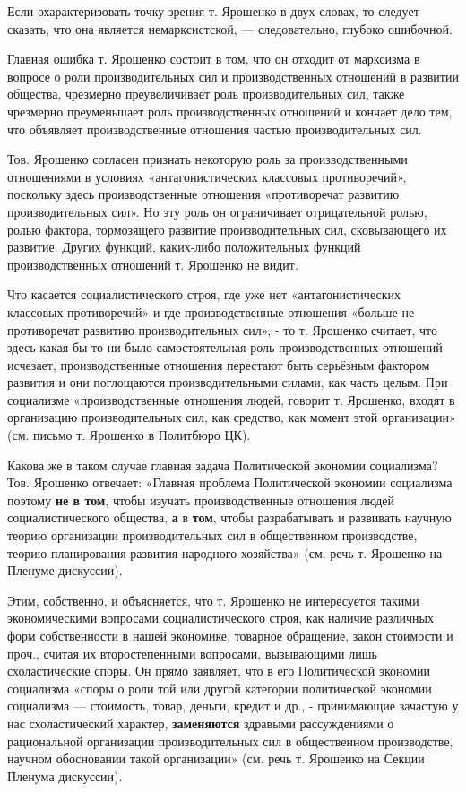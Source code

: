 \documentclass[12pt, a4paper, openany]{book}
\begin{document}
Если охарактеризовать точку зрения т. Ярошенко в двух словах, то следует сказать, что она является немарксистской, — следовательно, глубоко ошибочной.



Главная ошибка т. Ярошенко состоит в том, что он отходит от марксизма в вопросе о роли производительных сил и производственных отношений в развитии общества, чрезмерно преувеличивает роль производительных сил, также чрезмерно преуменьшает роль производственных отношений и кончает дело тем, что объявляет производственные отношения частью производительных сил.



Тов. Ярошенко согласен признать некоторую роль за производственными отношениями в условиях «антагонистических классовых противоречий», поскольку здесь производственные отношения «противоречат развитию производительных сил». Но эту роль он ограничивает отрицательной ролью, ролью фактора, тормозящего развитие производительных сил, сковывающего их развитие. Других функций, каких-либо положительных функций производственных отношений т. Ярошенко не видит.



Что касается социалистического строя, где уже нет «антагонистических классовых противоречий» и где производственные отношения «больше не противоречат развитию производительных сил», - то т. Ярошенко считает, что здесь какая бы то ни было самостоятельная роль производственных отношений исчезает, производственные отношения перестают быть серьёзным фактором развития и они поглощаются производительными силами, как часть целым. При социализме «производственные отношения людей, говорит т. Ярошенко, входят в организацию производительных сил, как средство, как момент этой организации» (см. письмо т. Ярошенко в Политбюро ЦК).



Какова же в таком случае главная задача Политической экономии социализма? Тов. Ярошенко отвечает: «Главная проблема Политической экономии социализма поэтому \textbf{не в том}, чтобы изучать производственные отношения людей социалистического общества, \textbf{а} в \textbf{том}, чтобы разрабатывать и развивать научную теорию организации производительных сил в общественном производстве, теорию планирования развития народного хозяйства» (см. речь т. Ярошенко на Пленуме дискуссии).



Этим, собственно, и объясняется, что т. Ярошенко не интересуется такими экономическими вопросами социалистического строя, как наличие различных форм собственности в нашей экономике, товарное обращение, закон стоимости и проч., считая их второстепенными вопросами, вызывающими лишь схоластические споры. Он прямо заявляет, что в его Политической экономии социализма «споры о роли той или другой категории политической экономии социализма — стоимость, товар, деньги, кредит и др., - принимающие зачастую у нас схоластический характер, \textbf{заменяются} здравыми рассуждениями о рациональной организации производительных сил в общественном производстве, научном обосновании такой организации» (см. речь т. Ярошенко на Секции Пленума дискуссии).
\end{document}
